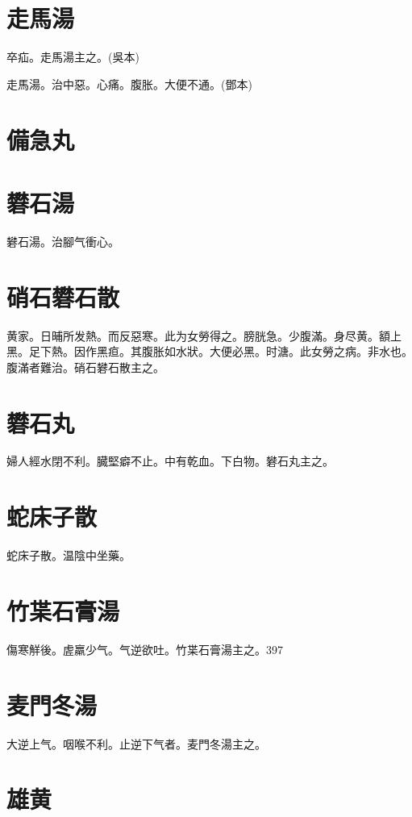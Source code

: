 \documentclass[12pt,twoside,UTF8,b5paper]{ctexbook}
\begin{document}
\section{走馬湯}

卒疝。走馬湯主之。(吳本)

走馬湯。治中惡。心痛。腹胀。大便不通。(鄧本)

\section{備急丸}

\section{礬石湯}

礬石湯。治腳气衝心。

\section{硝石礬石散}

黄家。日晡所发熱。而反惡寒。此为女勞得之。膀胱急。少腹滿。身尽黄。額上黑。足下熱。因作黑疸。其腹胀如水狀。大便必黑。时溏。此女勞之病。非水也。腹滿者難治。硝石礬石散主之。

\section{礬石丸}

婦人經水閉不利。臓堅癖不止。中有乾血。下白物。礬石丸主之。

\section{蛇床子散}

蛇床子散。温陰中坐藥。

\section{竹枼石膏湯}

傷寒觧後。虗羸少气。气逆欲吐。竹枼石膏湯主之。397

\section{麦門冬湯}

大逆上气。咽喉不利。止逆下气者。麦門冬湯主之。

\section{雄黄}
\end{document}
